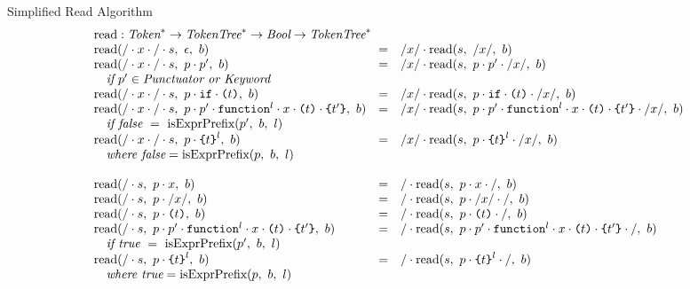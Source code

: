 \documentclass[preprint,10pt]{sigplanconf}
\begin{document}
\begin{displayfigure*}{\label{fig:simpleread}Simplified Read Algorithm}
\[\begin{array}{lcll}
    \multicolumn{3}{l}{\textrm{read} : \Tok^{*} \rightarrow \TT^{*}
      \rightarrow \textit{Bool} \rightarrow \TT^{*}}
    \\
    \readfn{/\cdot x \cdot /\cdot \vtok}{\epsilon}{b}
    &=&
    \cons{/x/}{
      \readfn{\vtok}{/x/}{b}
    }
    \\
    \readfn{/\cdot x \cdot /\cdot \vtok}{p \cdot p'}{b}
    &=&
    \cons{/x/}{
      \readfn{\vtok}{
        p \cdot p' \cdot /x/
      }{b}
    }
    \\
    \quad\textit{if}~p' \in \textit{Punctuator or Keyword}
    \\
    \readfn{/\cdot x \cdot /\cdot \vtok}{
      p \cdot \texttt{if} \cdot \parens{t}
    }{b}
    &=&
    \cons{/x/}{
      \readfn{\vtok}{p \cdot \texttt{if} \cdot \parens{t} \cdot /x/}{b}
    }
    \\
    \readfn{/\cdot x \cdot /\cdot \vtok}{
      p \cdot p' \cdot \texttt{function}^{l} \cdot x
      \cdot \parens{t} \cdot \curlies{t'}
    }{b}
    &=&
    \cons{/x/}{
      \readfn{\vtok}{
      p \cdot p' 
      \cdot \texttt{function}^{l} \cdot x \cdot 
      \parens{t} \cdot \curlies{t'}\cdot /x/
      }{b}
    } \\
    \quad \textit{if false}~=~ \isobject(p',~b,~l)
    \\
    \readfn{/\cdot x \cdot / \cdot \vtok}{
      p \cdot \curlies{t}^{l}
    }{b}
    &=&
    \cons{/x/}{
      \readfn{\vtok}{
        p \cdot \curlies{t}^{l}\cdot /x/
      }{b}
    }
    \\
    \quad \textit{where false} = \isobject(p,~b,~l)

    \\ \\

    \readfn{/\cdot \vtok}{p\cdot x}{b}
    &=&
    \cons{/}{
      \readfn{\vtok}{
        p\cdot x\cdot /
      }{b}
    }
    \\
    \readfn{/\cdot \vtok}{p \cdot /x/}{b}
    &=&
    \cons{/}{
      \readfn{\vtok}{
        p \cdot /x/ \cdot /
      }{b}
    }
    \\
    \readfn{/\cdot \vtok}{p \cdot \parens{t}}{b}
    &=&
    \cons{/}{
      \readfn{\vtok}{
        p \cdot \parens{t} \cdot /
      }{b}
    }
    \\
    \readfn{/\cdot \vtok}{
      p \cdot p' \cdot \texttt{function}^l \cdot x
      \cdot \parens{t} \cdot \curlies{t'}
    }{b}
    &=&
    \cons{/}{
      \readfn{\vtok}{
        p \cdot p' \cdot \texttt{function}^l \cdot x \cdot \parens{t}
        \cdot \curlies{t'} \cdot /
      }{b}
    }
    \\
    \quad \textit{if true}~=~\isobject(p',~b,~l)
    \\
    \readfn{/\cdot \vtok}{
      p \cdot \curlies{t}^{l}
    }{b}
    &=&
    \cons{/}{
      \readfn{\vtok}{
        p \cdot \curlies{t}^{l} \cdot /
      }{b}
    }
    \\
    \quad \textit{where true} = \isobject(p,~b,~l)


\end{array}\]
\end{displayfigure*}
\end{document}
